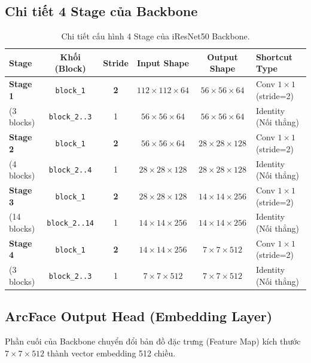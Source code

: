 \documentclass[11pt,a4paper]{article}
\begin{document}
\subsection{Chi tiết 4 Stage của Backbone}
\begin{table}[H]
\centering
\begin{tabular}{l c c c c l}
\toprule
\textbf{Stage} & \textbf{Khối (Block)} & \textbf{Stride} & \textbf{Input Shape} & \textbf{Output Shape} & \textbf{Shortcut Type} \\
\midrule
\textbf{Stage 1} & \texttt{block\_1} & \textbf{2} & $112 \times 112 \times 64$ & $56 \times 56 \times 64$ & Conv $1\times1$ (stride=2) \\
(3 blocks) & \texttt{block\_2..3} & 1 & $56 \times 56 \times 64$ & $56 \times 56 \times 64$ & Identity (Nối thẳng) \\
\midrule
\textbf{Stage 2} & \texttt{block\_1} & \textbf{2} & $56 \times 56 \times 64$ & $28 \times 28 \times 128$ & Conv $1\times1$ (stride=2) \\
(4 blocks) & \texttt{block\_2..4} & 1 & $28 \times 28 \times 128$ & $28 \times 28 \times 128$ & Identity (Nối thẳng) \\
\midrule
\textbf{Stage 3} & \texttt{block\_1} & \textbf{2} & $28 \times 28 \times 128$ & $14 \times 14 \times 256$ & Conv $1\times1$ (stride=2) \\
(14 blocks) & \texttt{block\_2..14} & 1 & $14 \times 14 \times 256$ & $14 \times 14 \times 256$ & Identity (Nối thẳng) \\
\midrule
\textbf{Stage 4} & \texttt{block\_1} & \textbf{2} & $14 \times 14 \times 256$ & $7 \times 7 \times 512$ & Conv $1\times1$ (stride=2) \\
(3 blocks) & \texttt{block\_2..3} & 1 & $7 \times 7 \times 512$ & $7 \times 7 \times 512$ & Identity (Nối thẳng) \\
\bottomrule
\end{tabular}
\caption{Chi tiết cấu hình 4 Stage của iResNet50 Backbone.}
\end{table}

\subsection{ArcFace Output Head (Embedding Layer)}
Phần cuối của Backbone chuyển đổi bản đồ đặc trưng (Feature Map) kích thước $7 \times 7 \times 512$ thành vector embedding 512 chiều.
\end{document}

